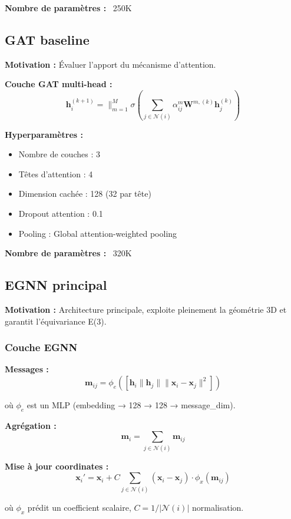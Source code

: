 \textbf{Nombre de paramètres :} ~250K

\subsection{GAT baseline}

\textbf{Motivation :}
Évaluer l'apport du mécanisme d'attention.

\textbf{Couche GAT multi-head :}
\[
\mathbf{h}_i^{(k+1)} = \|_{m=1}^M \sigma\left(\sum_{j \in \mathcal{N}(i)} \alpha_{ij}^m \mathbf{W}^{m,(k)}\mathbf{h}_j^{(k)}\right)
\]

\textbf{Hyperparamètres :}
\begin{itemize}
    \item Nombre de couches : 3
    \item Têtes d'attention : 4
    \item Dimension cachée : 128 (32 par tête)
    \item Dropout attention : 0.1
    \item Pooling : Global attention-weighted pooling
\end{itemize}

\textbf{Nombre de paramètres :} ~320K

\subsection{EGNN principal}

\textbf{Motivation :}
Architecture principale, exploite pleinement la géométrie 3D et garantit l'équivariance E(3).

\subsubsection{Couche EGNN}

\textbf{Messages :}
\[
\mathbf{m}_{ij} = \phi_e\left([\mathbf{h}_i \| \mathbf{h}_j \| \|\mathbf{x}_i - \mathbf{x}_j\|^2]\right)
\]

où $\phi_e$ est un MLP (embedding → 128 → 128 → message\_dim).

\textbf{Agrégation :}
\[
\mathbf{m}_i = \sum_{j \in \mathcal{N}(i)} \mathbf{m}_{ij}
\]

\textbf{Mise à jour coordinates :}
\[
\mathbf{x}_i' = \mathbf{x}_i + C \sum_{j \in \mathcal{N}(i)} (\mathbf{x}_i - \mathbf{x}_j) \cdot \phi_x(\mathbf{m}_{ij})
\]

où $\phi_x$ prédit un coefficient scalaire, $C = 1/|\mathcal{N}(i)|$ normalisation.

